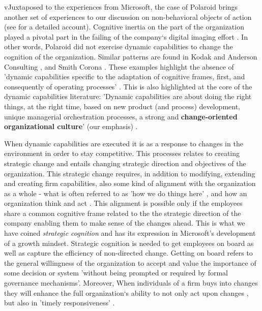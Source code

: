 \documentclass[review,fleqn]{elsarticle}\usepackage[]{graphicx}\usepackage[]{color}
\begin{document}
vJuxtaposed to the experiences from Microsoft, the case of Polaroid brings another set of
experiences to our discussion on non-behavioral objects of action (see \citep{Tripsas2000}
for a detailed account). Cognitive inertia on the part of the organization played a
pivotal part in the failing of the company`s digital imaging effort \citep{Verona2011}. In
other words, Polaroid did not exercise dynamic capabilities to change the cognition of the
organization. Similar patterns are found in Kodak and Anderson Consulting
\citep{Kaplan2005}, and Smith Corona \citep{Danneels2010}. These examples highlight the
absence of 'dynamic capabilities specific to the adaptation of cognitive frames, first,
and consequently of operating processes' \citep[p. 541]{Verona2011}. This is also
highlighted at the core of the dynamic capabilities literature: 'Dynamic capabilities are
about doing the right things, at the right time, based on new product (and process)
development, unique managerial orchestration processes, a strong and {\bf change-oriented
  organizational culture}' (our emphasis) \cite[p]{Teece2014}.

When dynamic capabilities are executed it is as a response to changes in the environment
in order to stay competitive. This processes relates to creating strategic change
\citep{Helfat2007} and entails changing strategic direction and objectives of the
organization. This strategic change requires, in addition to modifying, extending and
creating firm capabilities, also some kind of alignment with the organization as a whole -
what is often referred to as 'how we do things here' \citep{Nelson1982}, and how an
organization think and act \citep{Nadella2017}. This alignment is possible only if the
employees share a common cognitive frame related to the the strategic direction of the
company enabling them to make sense of the changes ahead. This is what we have coined
\emph{strategic cognition} and has its expression in Microsoft's development of a growth
mindset. Strategic cognition is needed to get employees on board as well as capture the
efficiency of non-directed change. Getting on board refers to the general willingness of
the organization to accept and value the importance of some decision or system 'without
being prompted or required by formal governance
mechanisms'\citep[p. 812]{Simsek2009}. Moreover, When individuals of a firm buys into
changes they will enhance the full organization`s ability to not only act upon changes
\citep{Marchand2004}, but also in 'timely responsiveness' \citep{Kohli1993}.
\end{document}
